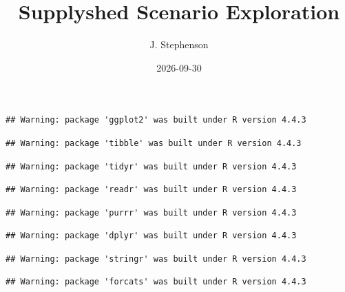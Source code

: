 \documentclass[
]{article}
\title{Supplyshed Scenario Exploration}
\author{J. Stephenson}
\date{2026-09-30}
\newenvironment{Shaded}{\begin{snugshade}}{\end{snugshade}}
\newcommand{\AttributeTok}[1]{\textcolor[rgb]{0.13,0.29,0.53}{#1}}
\newcommand{\CommentTok}[1]{\textcolor[rgb]{0.56,0.35,0.01}{\textit{#1}}}
\newcommand{\ConstantTok}[1]{\textcolor[rgb]{0.56,0.35,0.01}{#1}}
\newcommand{\FunctionTok}[1]{\textcolor[rgb]{0.13,0.29,0.53}{\textbf{#1}}}
\newcommand{\NormalTok}[1]{#1}
\newcommand{\SpecialCharTok}[1]{\textcolor[rgb]{0.81,0.36,0.00}{\textbf{#1}}}
\newcommand{\StringTok}[1]{\textcolor[rgb]{0.31,0.60,0.02}{#1}}
\begin{document}
\maketitle

{
\setcounter{tocdepth}{2}
\tableofcontents
}
\begin{Shaded}
\end{Shaded}

\begin{verbatim}
## Warning: package 'ggplot2' was built under R version 4.4.3
\end{verbatim}

\begin{verbatim}
## Warning: package 'tibble' was built under R version 4.4.3
\end{verbatim}

\begin{verbatim}
## Warning: package 'tidyr' was built under R version 4.4.3
\end{verbatim}

\begin{verbatim}
## Warning: package 'readr' was built under R version 4.4.3
\end{verbatim}

\begin{verbatim}
## Warning: package 'purrr' was built under R version 4.4.3
\end{verbatim}

\begin{verbatim}
## Warning: package 'dplyr' was built under R version 4.4.3
\end{verbatim}

\begin{verbatim}
## Warning: package 'stringr' was built under R version 4.4.3
\end{verbatim}

\begin{verbatim}
## Warning: package 'forcats' was built under R version 4.4.3
\end{verbatim}
\end{document}
